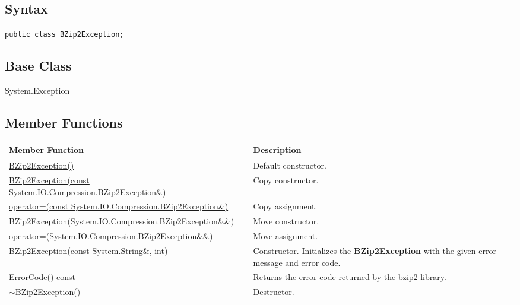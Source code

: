\documentclass[a4paper,oneside,11.000000pt]{book}
\begin{document}
\subsection*{Syntax}\texttt{public class BZip2Exception;}

\subsection*{Base Class}System.Exception\subsection{Member Functions}
\begin{flushleft}
\begin{supertabular}[l]{!{\raggedright}p{7.575cm}!{\raggedright}p{7.575cm}}
\textbf{Member Function}
& \textbf{Description}
\\
\hline
\hyperlink{System.IO.Compression.BZip2Exception.constructor.P.System.IO.Compression.BZip2Exception}{BZip2Exception()}
& Default constructor.

\\
\hyperlink{System.IO.Compression.BZip2Exception.constructor.P.System.IO.Compression.BZip2Exception.C.R.System.IO.Compression.BZip2Exception}{BZip2Exception(const System.\-IO.\-Compression.\-BZip2Exception\&\-)}
& Copy constructor.

\\
\hyperlink{System.IO.Compression.BZip2Exception.operator.assign.P.System.IO.Compression.BZip2Exception.C.R.System.IO.Compression.BZip2Exception}{operator=(const System.\-IO.\-Compression.\-BZip2Exception\&\-)}
& Copy assignment.

\\
\hyperlink{System.IO.Compression.BZip2Exception.constructor.P.System.IO.Compression.BZip2Exception.RR.System.IO.Compression.BZip2Exception}{BZip2Exception(System.\-IO.\-Compression.\-BZip2Exception\&\-\&\-)}
& Move constructor.

\\
\hyperlink{System.IO.Compression.BZip2Exception.operator.assign.P.System.IO.Compression.BZip2Exception.RR.System.IO.Compression.BZip2Exception}{operator=(System.\-IO.\-Compression.\-BZip2Exception\&\-\&\-)}
& Move assignment.

\\
\hyperlink{System.IO.Compression.BZip2Exception.constructor.P.System.IO.Compression.BZip2Exception.C.R.System.String.int}{BZip2Exception(const System.\-String\&\-, int)}
& Constructor. Initializes the \textbf{BZip2Exception}
 with the given error message and error code.

\\
\hyperlink{System.IO.Compression.BZip2Exception.ErrorCode.C.P.System.IO.Compression.BZip2Exception}{ErrorCode() const}
& Returns the error code returned by the bzip2 library.

\\
\hyperlink{System.IO.Compression.BZip2Exception.destructor.P.System.IO.Compression.BZip2Exception}{$\sim$BZip2Exception()}
& Destructor.

\\
\end{supertabular}

\end{flushleft}
\end{document}
